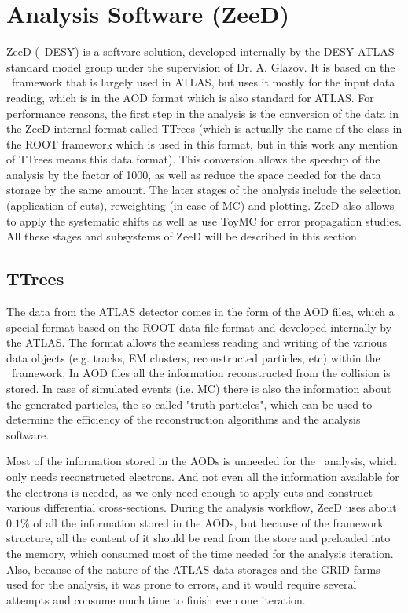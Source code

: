 \chapter{Analysis Software (ZeeD)}
\label{sec:ZeeD}
ZeeD (\Zee\ DESY) is a softvare solution, developed internally by the DESY ATLAS standard model group under the supervision of Dr. A. Glazov. It is based on the \Athena\ framework that is largely used in ATLAS, but uses it mostly for the input data reading, which is in the AOD format which is also standard for ATLAS. For performance reasons, the first step in the analysis is the conversion of the data in the ZeeD internal format called TTrees (which is actually the name of the class in the ROOT framework which is used in this format, but in this work any mention of TTrees means this data format). This conversion allows the speedup of the analysis by the factor of 1000, as well as reduce the space needed for the data storage by the same amount. The later stages of the analysis include the selection (application of cuts), reweighting (in case of MC) and plotting. ZeeD also allows to apply the systematic shifts as well as use ToyMC for error propagation studies. All these stages and subsystems of ZeeD will be described in this section.

\section{TTrees}
\label{sec:ZeeD_TTrees}

The data from the ATLAS detector comes in the form of the AOD files, which a special format based on the ROOT data file format and developed internally by the ATLAS. The format allows the seamless reading and writing of the various data objects (e.g. tracks, EM clusters, reconstructed particles, etc) within the \Athena\ framework. In AOD files all the information reconstructed from the collision is stored. In case of simulated events (i.e. MC) there is also the information about the generated particles, the so-called "truth particles", which can be used to determine the efficiency of the reconstruction algorithms and the analysis software.

Most of the information stored in the AODs is unneeded for the \Zee\ analysis, which only needs reconstructed electrons. And not even all the information available for the electrons is needed, as we only need enough to apply cuts and construct various differential cross-sections. During the analysis workflow, ZeeD uses about $0.1\%$ of all the information stored in the AODs, but because of the framework structure, all the content of it should be read from the store and preloaded into the memory, which consumed most of the time needed for the analysis iteration. Also, because of the nature of the ATLAS data storages and the GRID farms used for the analysis, it was prone to errors, and it would require several attempts and consume much time to finish even one iteration.

